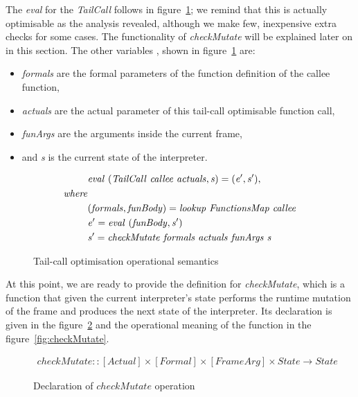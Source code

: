 \documentclass[diploma]{softlab-thesis}
\begin{document}
The \textit{eval} for the \textit{TailCall} follows in figure~\ref{fig:tco}; we remind that this is actually optimisable as the analysis 
revealed, although we make few, inexpensive extra checks for some cases.
The functionality of \textit{checkMutate} will be explained later on in this section. The other variables 
, shown in figure~\ref{fig:tco} are:
\begin{itemize}
  \item \textit{formals} are the formal parameters of the function definition of the callee function,
  \item \textit{actuals} are the actual parameter of this tail-call optimisable function call,
  \item \textit{funArgs} are the arguments inside the current frame, 
  \item and \textit{s} is the current state of the interpreter.
\end{itemize}


\begin{figure}[h]
  \begin{align*}
    & \mathit{eval \hfill\ (TailCall \hfill\ callee \hfill\ actuals, s) = (e', s'),} \\
    \mathit{where} \\
    & \mathit{(formals, funBody) = lookup \hfill\ FunctionsMap \hfill\ callee} \\
    & \mathit{e' = eval \hfill\ (funBody, s')} \\
    & \mathit{s' = checkMutate \hfill\ formals \hfill\ actuals \hfill\ funArgs \hfill\ s} 
  \end{align*}
\caption{Tail-call optimisation operational semantics \label{fig:tco}}
\end{figure}


At this point, we are ready to provide the definition for \textit{checkMutate}, which 
is a function that given the current interpreter's state performs the runtime mutation 
of the frame and produces the next state of the interpreter. Its declaration is given in 
the figure~\ref{fig:checkdecl} and the operational meaning of the function in the 
figure~\ref{fig:checkMutate}.

\begin{figure}[h]
  \begin{align*}
    \mathit{checkMutate :: [Actual] \times [Formal] \times [FrameArg] \times State \rightarrow State} 
  \end{align*}
\caption{Declaration of $\mathit{checkMutate}$ operation\label{fig:checkdecl}}
\end{figure}
\end{document}
